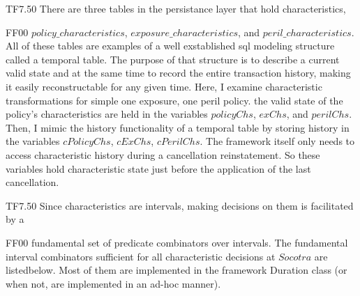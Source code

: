 \tlatex
{}
 \@x{}\moduleLeftDash{}\moduleRightDash\@xx{}%
%
\@pvspace{8.0pt}%
\@pvspace{8.0pt}%
\begin{lcom}{0}%
\begin{cpar}{0}{T}{F}{7.5}{0}{}%
There are three tables in the persistance layer that hold characteristics,
\end{cpar}%
\begin{cpar}{1}{F}{F}{0}{0}{}%
 \ensuremath{policy\_characteristics}, \ensuremath{exposure\_characteristics},
 and \ensuremath{peril\_characteristics}. All of these
 tables are examples of a well exstablished sql modeling structure called a
 temporal
 table. The purpose of that structure is to describe a current valid state
 and at the same
 time to record the entire transaction history, making it easily
 reconstructable for any
 given time.
 Here, I examine characteristic transformations for simple one exposure, one
 peril policy.
 the valid state of the policy\mbox{'}s characteristics are held in the
 variables \ensuremath{policyChs}, \ensuremath{exChs},
 and \ensuremath{perilChs}. Then, I mimic the history functionality of a
 temporal table by storing
 history in the variables \ensuremath{cPolicyChs}, \ensuremath{cExChs},
 \ensuremath{cPerilChs}. The framework itself only needs
 to access characteristic history during a cancellation reinstatement. So
 these variables
 hold characteristic state just before the application of the last
 cancellation.
\end{cpar}%
\end{lcom}%
\@x{}\midbar\@xx{}%
%
\@pvspace{8.0pt}%
\@x{}%
%
\@xx{}%
\begin{lcom}{0}%
\begin{cpar}{0}{T}{F}{7.5}{0}{}%
 Since characteristics are intervals, making decisions on them is facilitated
 by a
\end{cpar}%
\begin{cpar}{1}{F}{F}{0}{0}{}%
 fundamental set of predicate combinators over intervals. The fundamental
 interval
 combinators sufficient for all characteristic decisions at
 \ensuremath{Socotra} are listedbelow. Most
 of them are implemented in the framework Duration class (or when not, are
 implemented in
 an ad-hoc manner).
\end{cpar}%
\end{lcom}%
